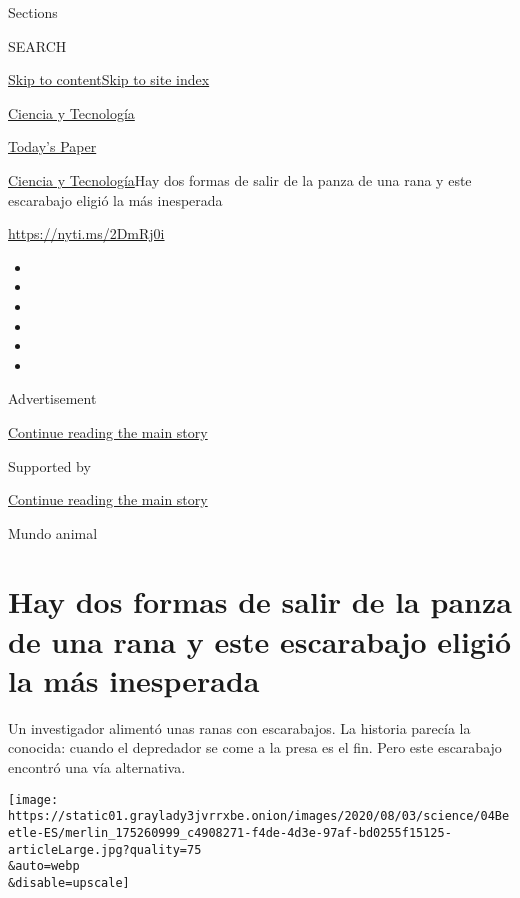Sections

SEARCH

\protect\hyperlink{site-content}{Skip to
content}\protect\hyperlink{site-index}{Skip to site index}

\href{https://www.nytimes3xbfgragh.onion/es/section/ciencia-y-tecnologia}{Ciencia
y Tecnología}

\href{https://myaccount.nytimes3xbfgragh.onion/auth/login?response_type=cookie\&client_id=vi}{}

\href{https://www.nytimes3xbfgragh.onion/section/todayspaper}{Today's
Paper}

\href{/es/section/ciencia-y-tecnologia}{Ciencia y
Tecnología}\textbar{}Hay dos formas de salir de la panza de una rana y
este escarabajo eligió la más inesperada

\url{https://nyti.ms/2DmRj0i}

\begin{itemize}
\item
\item
\item
\item
\item
\item
\end{itemize}

Advertisement

\protect\hyperlink{after-top}{Continue reading the main story}

Supported by

\protect\hyperlink{after-sponsor}{Continue reading the main story}

Mundo animal

\hypertarget{hay-dos-formas-de-salir-de-la-panza-de-una-rana-y-este-escarabajo-eligiuxf3-la-muxe1s-inesperada}{%
\section{Hay dos formas de salir de la panza de una rana y este
escarabajo eligió la más
inesperada}\label{hay-dos-formas-de-salir-de-la-panza-de-una-rana-y-este-escarabajo-eligiuxf3-la-muxe1s-inesperada}}

Un investigador alimentó unas ranas con escarabajos. La historia parecía
la conocida: cuando el depredador se come a la presa es el fin. Pero
este escarabajo encontró una vía alternativa.

\texttt{[image: https://static01.graylady3jvrrxbe.onion/images/2020/08/03/science/04Beetle-ES/merlin\_175260999\_c4908271-f4de-4d3e-97af-bd0255f15125-articleLarge.jpg?quality=75\\\&auto=webp\\\&disable=upscale]}

